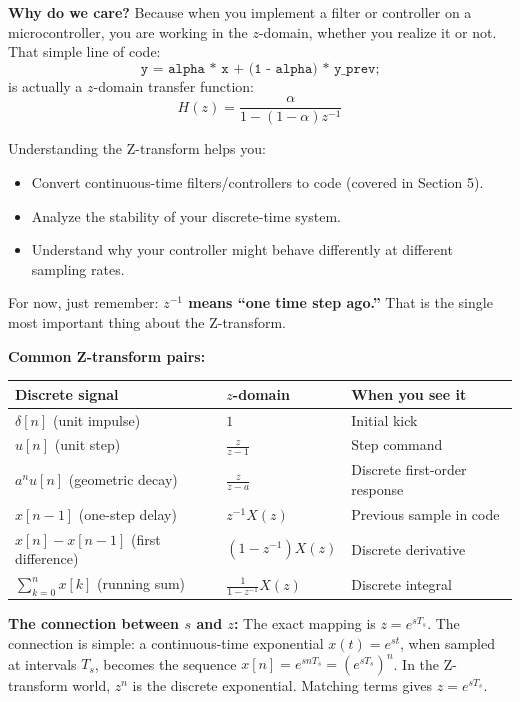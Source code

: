 \textbf{Why do we care?} Because when you implement a filter or controller on a microcontroller, you are working in the $z$-domain, whether you realize it or not. That simple line of code:
\[
\texttt{y = alpha * x + (1 - alpha) * y\_prev;}
\]
is actually a $z$-domain transfer function:
\[
H(z) = \frac{\alpha}{1 - (1-\alpha)z^{-1}}
\]

Understanding the Z-transform helps you:
\begin{itemize}
    \item Convert continuous-time filters/controllers to code (covered in Section 5).
    \item Analyze the stability of your discrete-time system.
    \item Understand why your controller might behave differently at different sampling rates.
\end{itemize}

For now, just remember: \textbf{$z^{-1}$ means ``one time step ago.''} That is the single most important thing about the Z-transform.

\textbf{Common Z-transform pairs:}

\begin{center}
\begin{tabular}{lll}
\toprule
\textbf{Discrete signal} & \textbf{$z$-domain} & \textbf{When you see it} \\
\midrule
$\delta[n]$ (unit impulse) & $1$ & Initial kick \\
$u[n]$ (unit step) & $\frac{z}{z-1}$ & Step command \\
$a^n u[n]$ (geometric decay) & $\frac{z}{z-a}$ & Discrete first-order response \\
$x[n-1]$ (one-step delay) & $z^{-1}X(z)$ & Previous sample in code \\
$x[n] - x[n-1]$ (first difference) & $(1 - z^{-1})X(z)$ & Discrete derivative \\
$\sum_{k=0}^{n} x[k]$ (running sum) & $\frac{1}{1 - z^{-1}}X(z)$ & Discrete integral \\
\bottomrule
\end{tabular}
\end{center}

\textbf{The connection between $s$ and $z$:} The exact mapping is $z = e^{sT_s}$. The connection is simple: a continuous-time exponential $x(t) = e^{st}$, when sampled at intervals $T_s$, becomes the sequence $x[n] = e^{snT_s} = (e^{sT_s})^n$. In the Z-transform world, $z^n$ is the discrete exponential. Matching terms gives $z = e^{sT_s}$.

